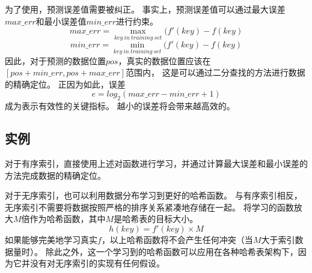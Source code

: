 为了使用{\rmi}，预测误差值需要被纠正。
事实上，预测误差值可以通过最大误差$max\_err$和最小误差值$min\_err$进行约束。
\[ max\_err = \max_{key\ in\ training\ set}(f'(key)-f(key) \]
\[ min\_err = \min_{key\ in\ training\ set}(f'(key)-f(key) \]
因此，对于{\rmi}预测的数据位置$pos$，真实的数据位置应该在$[pos + min\_err, pos + max\_err]$范围内，
这是可以通过二分查找的方法进行数据的精确定位。
正因为如此，{\model}误差
$$e = log_2(max\_err - min\_err + 1)$$
成为表示{\rmi}有效性的关键指标。
越小的{\model}误差将会带来越高效的{\rmi}。


\subsection{{\li}实例}

对于有序索引，{\li}直接使用上述{\rmi}对{\cdf}函数进行学习，并通过计算最大误差和最小误差的方法完成数据的精确定位。

对于无序索引，{\li}也可以利用数据分布学习到更好的哈希函数。
与有序索引相反，无序索引不需要将数据按照严格的排序关系紧凑地存储在一起。
{\li}将学习的{\cdf}函数放大$M$倍作为哈希函数，其中$M$是哈希表的目标大小。
\[ h(key) = f'(key) \times M \]
如果{\rmi}能够完美地学习真实{\cdf}$f$，以上哈希函数将不会产生任何冲突（当$M$大于索引数据量时）。
除此之外，这一个学习到的哈希函数可以应用在各种哈希表架构下，因为它并没有对无序索引的实现有任何假设。


